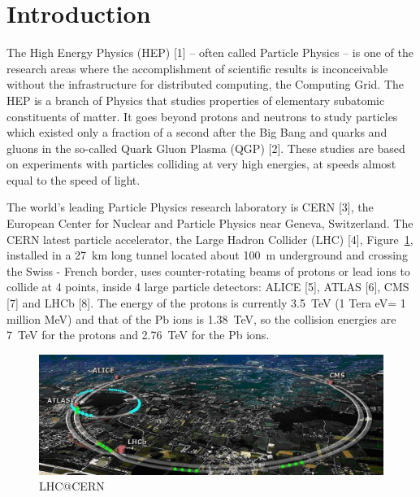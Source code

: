 \documentclass{intech}
\affiliation{Nuclear Physics Institute, \v{R}e\v{z} near Prague}
\begin{document}
\maketitle

\section{Introduction}

The High Energy Physics (HEP) [1] -- often called Particle
Physics -- is one of the research areas where the accomplishment of
scientific results is  inconceivable without the infrastructure for
distributed computing, the Computing Grid. The HEP is a branch of
Physics that studies properties of elementary subatomic constituents
of matter. It goes beyond protons and neutrons to study particles
which existed only a fraction of a second after the Big Bang and
quarks and gluons in the so-called Quark Gluon Plasma (QGP) [2].
These studies are based on experiments with particles colliding at
very high energies, at speeds almost equal to the speed of light.

The world's leading Particle Physics research laboratory is CERN
[3], the European Center for Nuclear and Particle Physics near
Geneva, Switzerland. The CERN latest particle accelerator, the Large
Hadron Collider (LHC) [4], Figure~\ref{fig01}, installed in a 27~km
long tunnel located about 100~m underground and crossing the Swiss -
French border, uses counter-rotating beams of protons or lead ions
to collide at 4 points, inside 4 large particle detectors: ALICE
[5], ATLAS [6], CMS [7] and LHCb [8].
The energy of the protons is
currently 3.5~TeV (1 Tera eV= 1 million MeV) and that of the Pb ions is
1.38~TeV, so the collision energies are 7~TeV for the protons and
2.76~TeV for the Pb ions.

\begin{figure}[htb] %
\centering
\includegraphics[width=13cm]{fig01.eps} %
\caption{LHC@CERN}\label{fig01}
\end{figure}
\end{document}
